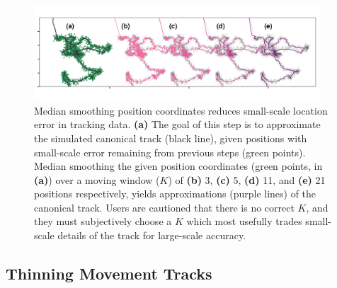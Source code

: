 \documentclass[10pt,paper=a4,headings=standardclasses
]{scrartcl}
\begin{document}
\begin{figure}[h!]
    \centering
    \includegraphics[width=0.95\textwidth]{figures/fig_03_median_smooth.png}
    \caption{Median smoothing position coordinates reduces small-scale location error in tracking data. 
    \textbf{(a)} The goal of this step is to approximate the simulated canonical track (black line), given positions with small-scale error remaining from previous steps (green points). 
    Median smoothing the given position coordinates (green points, in \textbf{(a)}) over a moving window ($K$) of \textbf{(b)} 3, \textbf{(c)} 5, \textbf{(d)} 11, and \textbf{(e)} 21 positions respectively, yields approximations (purple lines) of the canonical track.
    Users are cautioned that there is no correct $K$, and they must subjectively choose a $K$ which most usefully trades small-scale details of the track for large-scale accuracy.}
    \label{fig:figure_median_smooth}
\end{figure}

\subsection{Thinning Movement Tracks}
\end{document}

